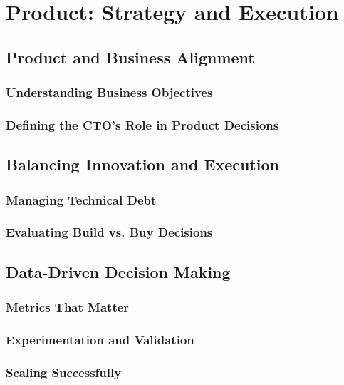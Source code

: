 \chapter{Product: Strategy and Execution}
\section{Product and Business Alignment}
\subsection{Understanding Business Objectives}
\subsection{Defining the CTO's Role in Product Decisions}
\section{Balancing Innovation and Execution}
\subsection{Managing Technical Debt}
\subsection{Evaluating Build vs. Buy Decisions}
\section{Data-Driven Decision Making}
\subsection{Metrics That Matter}
\subsection{Experimentation and Validation}
\subsection{Scaling Successfully}
